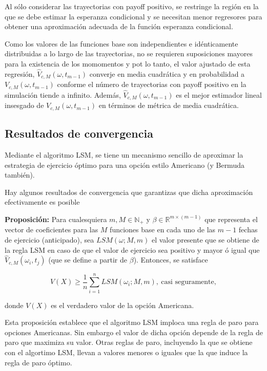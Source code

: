 \documentclass[12pt,reqno,letter]{article}
\begin{document}
	Al sólo considerar las trayectorias con payoff positivo, se restringe la
	región en la que se debe estimar la esperanza condicional y se necesitan
	menor regresores para obtener una aproximación adecuada de la función
	esperanza condicional.
	
	Como los valores de las funciones base son independientes e
	idénticamente distribuidas a lo largo de las trayectorias, no se
	requieren suposiciones mayores para la existencia de los momomentos y
	pot lo tanto, el valor ajustado de esta regresión,
	\(\widehat{V}_{c,M}(\omega,t_{m-1})\) converje en media cuadrática y en
	probabilidad a \(V_{c,M}(\omega,t_{m-1})\) conforme el número de
	trayectorias con payoff positivo en la simulación tiende a infinito.
	Además, \(\widehat{V}_{c,M}(\omega,t_{m-1})\) es el mejor estimador
	lineal insesgado de \(V_{c,M}(\omega,t_{m-1})\) en términos de métrica
	de media cuadrática.
	
	\subsection{Resultados de
		convergencia}\label{resultados-de-convergencia}
	
	Mediante el algoritmo LSM, se tiene un mecanismo sencillo de aproximar
	la estrategia de ejercicio óptimo para una opción estilo Americano (y
	Bermuda también).
	
	Hay algunos resultados de convergencia que garantizas que dicha
	aproximación efectivamente es posible
	
	\textbf{Proposición:} Para cualesquiera \(m,M\in \mathbb{N}_+\) y
	\(\beta\in\mathbb{R}^{m\times(m-1)}\) que representa el vector de
	coeficientes para las \(M\) funciones base en cada uno de las \(m-1\)
	fechas de ejercicio (anticipado), sea \(LSM(\omega;M,m)\) el valor
	presente que se obtiene de la regla LSM en caso de que el valor de
	ejercicio sea positivo y mayor ó igual que
	\(\widehat{V}_{c,M}(\omega_i,t_j)\) (que se define a partir de
	\(\beta\)). Entonces, se satisface
	
	\[V(X)\geq \frac{1}{n}\sum_{i=1}^n LSM(\omega_i;M,m),\ \mbox{casi seguramente},\]
	
	donde \(V(X)\) es el verdadero valor de la opción Americana.
	
	Esta proposición establece que el algoritmo LSM imploca una regla de
	paro para opciones Americanas. Sin embargo el valor de dicha opción
	depende de la regla de paro que maximiza su valor. Otras reglas de paro,
	incluyendo la que se obtiene con el algortimo LSM, llevan a valores
	menores o iguales que la que induce la regla de paro óptimo.
	
\end{document}
